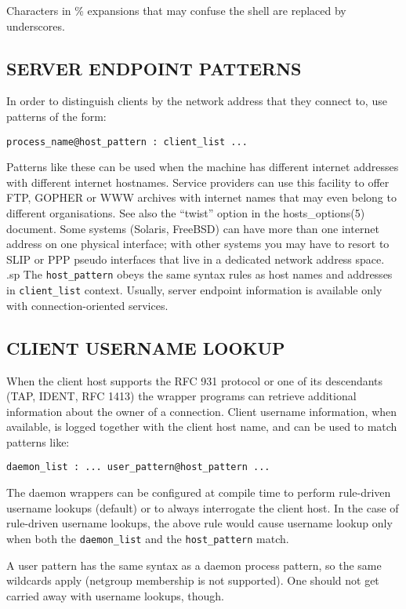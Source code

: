\documentclass[11pt,twoside,onecolumn]{book}
\begin{document}
Characters in \% expansions that may confuse the shell are replaced by
underscores.

\subsection*{SERVER ENDPOINT PATTERNS}

In order to distinguish clients by the network address that they
connect to, use patterns of the form:

{\tt process\_name@host\_pattern : client\_list ... }

Patterns like these can be used when the machine has different internet
addresses with different internet hostnames.  Service providers can use
this facility to offer FTP, GOPHER or WWW archives with internet names
that may even belong to different organisations. See also the ``twist''
option in the hosts\_options(5) document. Some systems (Solaris,
FreeBSD) can have more than one internet address on one physical
interface; with other systems you may have to resort to SLIP or PPP
pseudo interfaces that live in a dedicated network address space.
.sp
The {\tt host\_pattern} obeys the same syntax rules as host names and
addresses in {\tt client\_list} context. Usually, server endpoint information
is available only with connection-oriented services.


\subsection*{CLIENT USERNAME LOOKUP}

When the client host supports the RFC 931 protocol or one of its
descendants (TAP, IDENT, RFC 1413) the wrapper programs can retrieve
additional information about the owner of a connection. Client username
information, when available, is logged together with the client host
name, and can be used to match patterns like:

{\tt daemon\_list : ... user\_pattern@host\_pattern ...}

The daemon wrappers can be configured at compile time to perform
rule-driven username lookups (default) or to always interrogate the
client host.  In the case of rule-driven username lookups, the above
rule would cause username lookup only when both the {\tt daemon\_list}
and the {\tt host\_pattern} match. 

A user pattern has the same syntax as a daemon process pattern, so the
same wildcards apply (netgroup membership is not supported).  One
should not get carried away with username lookups, though.
\end{document}
